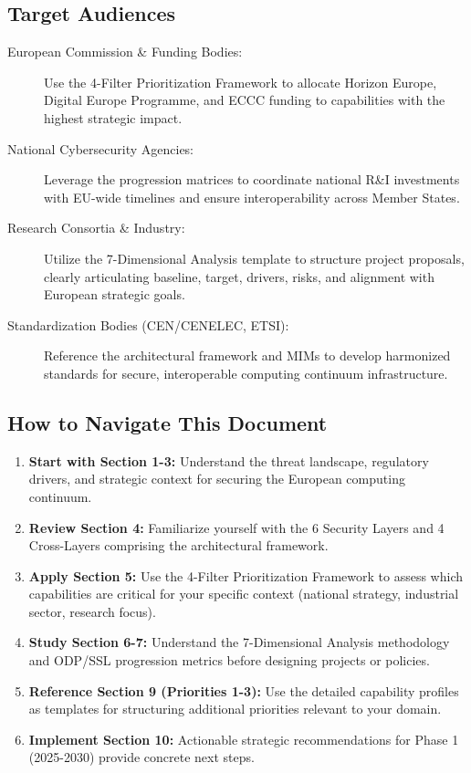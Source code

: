 \documentclass{ieeeaccess}
\begin{document}
\subsection*{Target Audiences}
\begin{description}
    \item[European Commission \& Funding Bodies:] Use the 4-Filter Prioritization Framework to allocate Horizon Europe, Digital Europe Programme, and ECCC funding to capabilities with the highest strategic impact.
    
    \item[National Cybersecurity Agencies:] Leverage the progression matrices to coordinate national R\&I investments with EU-wide timelines and ensure interoperability across Member States.
    
    \item[Research Consortia \& Industry:] Utilize the 7-Dimensional Analysis template to structure project proposals, clearly articulating baseline, target, drivers, risks, and alignment with European strategic goals.
    
    \item[Standardization Bodies (CEN/CENELEC, ETSI):] Reference the architectural framework and MIMs to develop harmonized standards for secure, interoperable computing continuum infrastructure.
\end{description}

\subsection*{How to Navigate This Document}
\begin{enumerate}
    \item \textbf{Start with Section 1-3:} Understand the threat landscape, regulatory drivers, and strategic context for securing the European computing continuum.
    
    \item \textbf{Review Section 4:} Familiarize yourself with the 6 Security Layers and 4 Cross-Layers comprising the architectural framework.
    
    \item \textbf{Apply Section 5:} Use the 4-Filter Prioritization Framework to assess which capabilities are critical for your specific context (national strategy, industrial sector, research focus).
    
    \item \textbf{Study Section 6-7:} Understand the 7-Dimensional Analysis methodology and ODP/SSL progression metrics before designing projects or policies.
    
    \item \textbf{Reference Section 9 (Priorities 1-3):} Use the detailed capability profiles as templates for structuring additional priorities relevant to your domain.
    
    \item \textbf{Implement Section 10:} Actionable strategic recommendations for Phase 1 (2025-2030) provide concrete next steps.
\end{enumerate}
\end{document}

